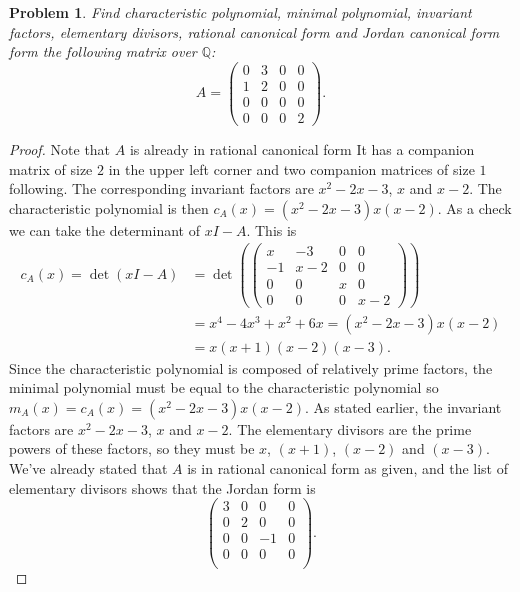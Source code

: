 \documentclass{article}
\newtheorem{problem}{Problem}
\begin{document}
\begin{problem}
Find characteristic polynomial, minimal polynomial, invariant factors, elementary divisors, rational canonical form and Jordan canonical form form the following matrix over $\mathbb{Q}$:
\[
A =
\left (
\begin{array}{cccc}
0 & 3 & 0 & 0\\
1 & 2 & 0 & 0\\
0 & 0 & 0 & 0\\
0 & 0 & 0 & 2
\end{array}
\right ).
\]
\end{problem}
\begin{proof}
Note that $A$ is already in rational canonical form It has a companion matrix of size $2$ in the upper left corner and two companion matrices of size $1$ following. The corresponding invariant factors are $x^2-2x-3$, $x$ and $x-2$. The characteristic polynomial is then $c_A(x) = (x^2-2x-3)x(x-2)$. As a check we can take the determinant of $xI-A$. This is
\begin{align*}
c_A(x) = \det (xI-A)
&= \det \left (
\left (
\begin{array}{cccc}
x & -3 & 0 & 0\\
-1 & x-2 & 0 & 0\\
0 & 0 & x & 0\\
0 & 0 & 0 & x-2
\end{array}
\right ) \right )\\
&= x^4 - 4x^3 + x^2 + 6x = (x^2-2x-3)x(x-2)\\
&= x(x+1)(x-2)(x-3).
\end{align*}
Since the characteristic polynomial is composed of relatively prime factors, the minimal polynomial must be equal to the characteristic polynomial so $m_A(x) = c_A(x) = (x^2-2x-3)x(x-2)$. As stated earlier, the invariant factors are $x^2-2x-3$, $x$ and $x-2$. The elementary divisors are the prime powers of these factors, so they must be $x$, $(x+1)$, $(x-2)$ and $(x-3)$. We've already stated that $A$ is in rational canonical form as given, and the list of elementary divisors shows that the Jordan form is
\[
\left (
\begin{array}{cccc}
3 & 0 & 0 & 0\\
0 & 2 & 0 & 0\\
0 & 0 & -1 & 0\\
0 & 0 & 0 & 0\\
\end{array}
\right ).
\]
\end{proof}
\end{document}
